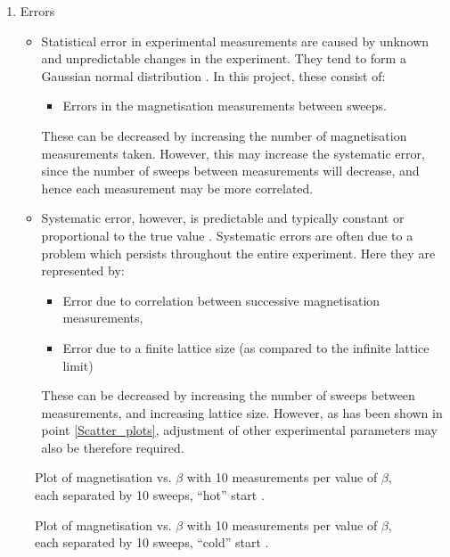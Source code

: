 \documentclass[a4paper]{article}
\begin{document}
\begin{enumerate}
	\item Errors
		\begin{itemize}
			\item Statistical error in experimental measurements are caused by unknown and unpredictable changes in the experiment. They tend to form a Gaussian normal distribution \cite{Rand_v_syst_err}. In this project, these consist of:
				\begin{itemize}
					\item Errors in the magnetisation measurements between sweeps.
				\end{itemize}
			These can be decreased by increasing the number of magnetisation measurements taken. However, this may increase the systematic error, since the number of sweeps between measurements will decrease, and hence each measurement may be more correlated.
			\item Systematic error, however, is predictable and typically constant or proportional to the true value \cite{Syst_Wiki}. Systematic errors are often due to a problem which persists throughout the entire experiment. Here they are represented by:
				\begin{itemize}
					\item  Error due to correlation between successive magnetisation measurements, 
					\item  Error due to a finite lattice size (as compared to the infinite lattice limit)
		 		\end{itemize}
	 		These can be decreased by increasing the number of sweeps between measurements, and increasing lattice size. However, as has been shown in point \ref{Scatter_plots}, adjustment of other experimental parameters may also be therefore required.
		\end{itemize}
\end{enumerate}

\clearpage
\begin{figure}[ht!]
	\centering
	
	\caption{Plot of magnetisation vs. $\beta$ with 10 measurements per value of $\beta$, each separated by 10 sweeps, ``hot'' start .}\label{Fig_mag_plot_64_hot}
\end{figure}

\clearpage
\begin{figure}[ht!]
	\centering
	
	\caption{Plot of magnetisation vs. $\beta$ with 10 measurements per value of $\beta$, each separated by 10 sweeps, ``cold'' start .}\label{Fig_mag_plot_64_cold}
\end{figure}
\end{document}
